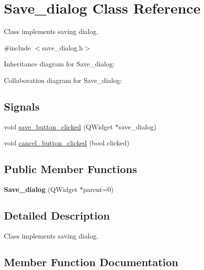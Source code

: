 \hypertarget{classSave__dialog}{}\section{Save\+\_\+dialog Class Reference}
\label{classSave__dialog}


Class implements saving dialog.  




{\ttfamily \#include $<$save\+\_\+dialog.\+h$>$}



Inheritance diagram for Save\+\_\+dialog\+:


Collaboration diagram for Save\+\_\+dialog\+:
\subsection*{Signals}
\begin{DoxyCompactItemize}
\item 
void \hyperlink{classSave__dialog_af48e09f5cc68888ed9e5c9a6c40d0eac}{save\+\_\+button\+\_\+clicked} (Q\+Widget $\ast$save\+\_\+dialog)
\item 
void \hyperlink{classSave__dialog_a6dfeb235ab1396df19c2c387027ce5b5}{cancel\+\_\+button\+\_\+clicked} (bool clicked)
\end{DoxyCompactItemize}
\subsection*{Public Member Functions}
\begin{DoxyCompactItemize}
\item 
{\bfseries Save\+\_\+dialog} (Q\+Widget $\ast$parent=0)\hypertarget{classSave__dialog_acd11061dbb66d618698a03414055b4f8}{}\label{classSave__dialog_acd11061dbb66d618698a03414055b4f8}

\end{DoxyCompactItemize}


\subsection{Detailed Description}
Class implements saving dialog. 

\subsection{Member Function Documentation}

